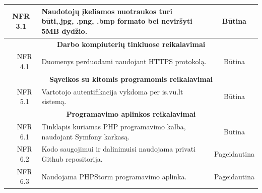 \documentclass{VUMIFPSkursinis}
\begin{document}
\begin{table}[H]
\begin{tabular}{|p{1cm}|p{1cm}|p{}|p{}|}
		\hline
		\multicolumn{2}{|c|}{NFR 3.1}&
		{Naudotojų įkeliamos nuotraukos turi būti,.jpg, .png, .bmp formato bei neviršyti 5MB dydžio.
		}&
		\multicolumn{1}{c|}{Būtina}\\
		
		\hline
		\multicolumn{4}{|c|}{\bfseries Darbo kompiuterių tinkluose reikalavimai}\\		
		
		\hline
		\multicolumn{1}{|c}{}&
		\multicolumn{1}{c|}{NFR 4.1}&
		{Duomenys perduodami naudojant HTTPS protokolą.
		}&
		\multicolumn{1}{c|}{Būtina}\\	
		
		\hline
		\multicolumn{4}{|c|}{\bfseries Sąveikos su kitomis programomis reikalavimai}\\	
		\hline
		\multicolumn{1}{|c}{}&
		\multicolumn{1}{c|}{NFR 5.1}&
		{Vartotojo autentifikacija vykdoma per is.vu.lt sistemą.
		}&
		\multicolumn{1}{c|}{Būtina}\\
		
		\hline
		\multicolumn{4}{|c|}{\bfseries Programavimo aplinkos reikalavimai}\\	
		\hline
		\multicolumn{1}{|c}{}&
		\multicolumn{1}{c|}{NFR 6.1}&
		{Tinklapis kuriamas PHP programavimo kalba, naudojant
			Symfony karkasą.
		}&
		\multicolumn{1}{c|}{Būtina}\\		
		
		\hline
		\multicolumn{1}{|c}{}&
		\multicolumn{1}{c|}{NFR 6.2}&
		{Kodo saugojimui ir dalinimuisi naudojama privati Github repositorija.
		}&
		\multicolumn{1}{c|}{Pageidautina}\\	
		
		\hline
		\multicolumn{1}{|c}{}&
		\multicolumn{1}{c|}{NFR 6.3}&
		{Naudojama PHPStorm programavimo aplinka.
		}&
		\multicolumn{1}{c|}{Pageidautina}\\									
		
		\hline
	\end{tabular}		
\end{table}
\end{document}
